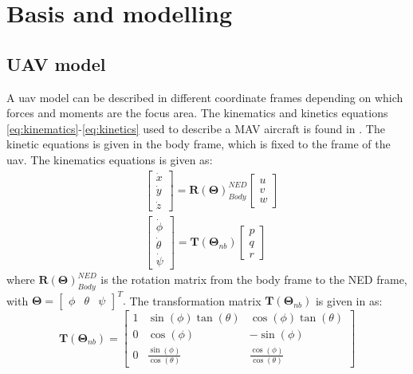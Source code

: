 \chapter{Basis and modelling}
\section{UAV model}
A \gls{uav} model can be described in different coordinate frames depending on which forces and moments are the focus area. The kinematics and kinetics equations \eqref{eq:kinematics}-\eqref{eq:kinetics} used to describe a MAV aircraft is found in \citep{beard2012small}. The kinetic equations is given in the body frame, which is fixed to the frame of the \gls{uav}. The kinematics equations is given as:
\begin{subequations}
\label{eq:kinematics}
\begin{align}\label{eq:kinematicsPosition}
& \begin{bmatrix}
\dot{x} \\
\dot{y} \\
\dot{z}
\end{bmatrix}
=
 \mathbf{R}(\mathbf{\Theta})_{Body}^{NED}\begin{bmatrix}
 u \\
 v \\
 w
 \end{bmatrix} \\
& \begin{bmatrix}
\dot{\phi} \\
\dot{\theta} \\
\dot{\psi}
\end{bmatrix}
= 
\mathbf{T}(\mathbf{\Theta}_{nb})\begin{bmatrix}
p \\
q \\
r
\end{bmatrix}\label{eq:kinematicsAttitude}
\end{align}
\end{subequations}
where $\mathbf{R}(\mathbf{\Theta})_{Body}^{NED}$ is the rotation matrix from the body frame to the NED frame, with $\mathbf{\Theta} = \begin{bmatrix}
\phi & \theta & \psi
\end{bmatrix}^T.$ The transformation matrix $\mathbf{T}(\mathbf{\Theta}_{nb})$ is given in \citep{fossen2011handbook} as:
\begin{equation}
\mathbf{T}(\mathbf{\Theta}_{nb}) = \begin{bmatrix}
1 & \sin(\phi)\tan(\theta) & \cos(\phi)\tan(\theta) \\
0 & \cos(\phi) & -\sin(\phi) \\
0 & \frac{\sin(\phi)}{\cos(\theta)} & \frac{\cos(\phi)}{\cos(\theta)}
\end{bmatrix}
\end{equation}
